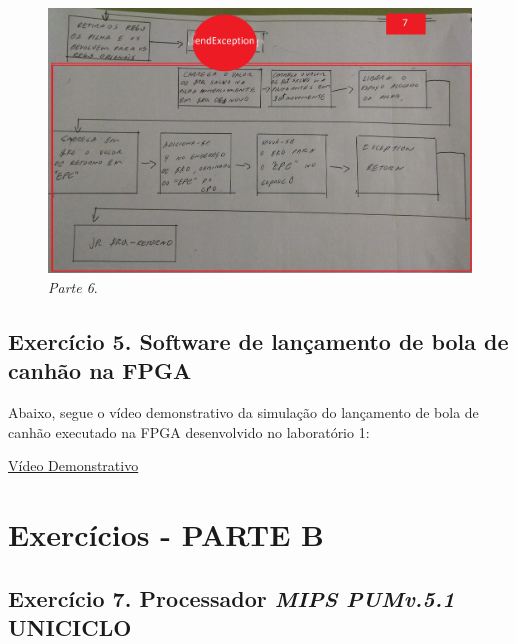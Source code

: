 \documentclass[12pt]{article}
\begin{document}
\begin{figure}[H]
	\flushleft
	\includegraphics[scale=0.12]{imagens/4.jpg}
	\caption{ \textit{Parte 6}.}
	\label{fig:ex1st}
\end{figure}


\subsection{Exercício 5. Software de lançamento de bola de canhão na FPGA}
\label{subsec:canhao}

Abaixo, segue o vídeo demonstrativo da simulação do lançamento de bola de canhão executado na FPGA desenvolvido no laboratório 1:

\href{https://youtu.be/ipDxgTOtXDA}{Vídeo Demonstrativo}


\section{Exercícios - PARTE B}
\label{sec:exerciciosB}

\subsection{Exercício 7. Processador \textit{MIPS PUMv.5.1} UNICICLO}
\label{subsec:mips_uniciclo}
\end{document}
